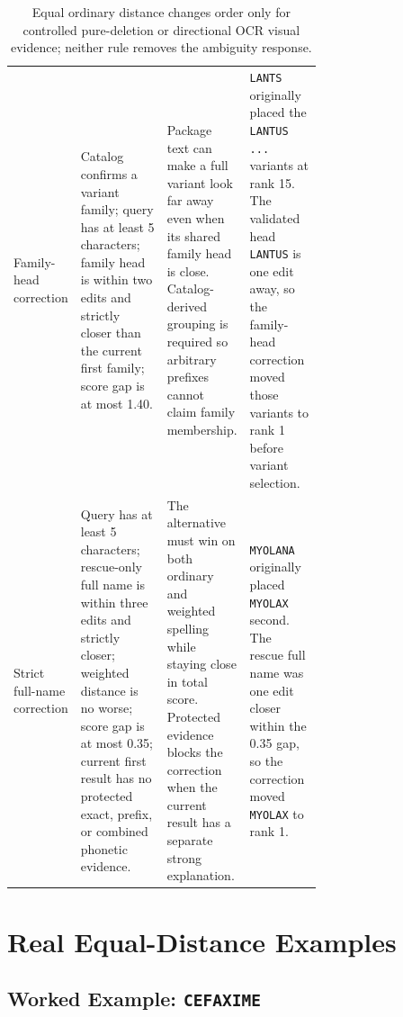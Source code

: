 \documentclass[11pt,a4paper]{article}
\newcommand{\code}[1]{\texttt{#1}}
\begin{document}
\begin{table}[H]
\begin{tabularx}{\linewidth}{@{}L{0.16\linewidth}L{0.29\linewidth}L{0.23\linewidth}Y@{}}
Family-head correction & Catalog confirms a variant family; query has at least 5 characters; family head is within two edits and strictly closer than the current first family; score gap is at most 1.40. & Package text can make a full variant look far away even when its shared family head is close. Catalog-derived grouping is required so arbitrary prefixes cannot claim family membership. & \code{LANTS} originally placed the \code{LANTUS ...} variants at rank 15. The validated head \code{LANTUS} is one edit away, so the family-head correction moved those variants to rank 1 before variant selection. \\
Strict full-name correction & Query has at least 5 characters; rescue-only full name is within three edits and strictly closer; weighted distance is no worse; score gap is at most 0.35; current first result has no protected exact, prefix, or combined phonetic evidence. & The alternative must win on both ordinary and weighted spelling while staying close in total score. Protected evidence blocks the correction when the current result has a separate strong explanation. & \code{MYOLANA} originally placed \code{MYOLAX} second. The rescue full name was one edit closer within the 0.35 gap, so the correction moved \code{MYOLAX} to rank 1. \\
\bottomrule
\end{tabularx}
\caption{Equal ordinary distance changes order only for controlled pure-deletion or directional OCR visual evidence; neither rule removes the ambiguity response.}
\label{tab:corrections}
\end{table}

\section{Real Equal-Distance Examples}


\subsection{Worked Example: \code{CEFAXIME}}
\end{document}
